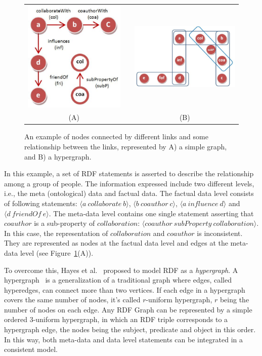 \begin{figure}[tbh]
\begin{center}
\begin{tabular}{ccc}
\includegraphics[width=.25\textwidth]{fig/reg_graph.eps} & &
\includegraphics[width=.43\textwidth]{fig/hypergraph.eps}\\
(A) & & (B)\\
\end{tabular}
\end{center}
\caption{\label{fig:graphcomp} An example of nodes connected by different links and some relationship between the links, represented by A) a simple graph, and B) a hypergraph.}
\end{figure}

\begin{myexp}
\label{graphcomp}
In this example, a set of RDF statements is asserted to describe the relationship among a group of people. The information expressed include two different levels, i.e., the meta (ontological) data and factual data. The factual data level consists of following statements: $\langle a~ collaborate~ b\rangle$, $\langle b~ coauthor~ c\rangle$, $\langle a~ influence~ d\rangle$ and $\langle d~ friendOf~ e\rangle$. The meta-data level contains one single statement asserting that $coauthor$ is a sub-property of $collaboration$: $\langle coauthor~ subProperty~ collaboration\rangle$. In this case, the representation of $collaboration$ and $coauthor$ is inconsistent. They are represented as nodes at the factual data level and edges at the meta-data level (see Figure~\ref{fig:graphcomp}(A)).
\end{myexp}

To overcome this, Hayes et al.~\cite{GraphModelRDF} proposed to model RDF as a \emph{hypergraph}. A hypergraph~\cite{Hypergraph} is a generalization of a traditional graph where edges, called hyperedges, can connect more than two vertices. If each edge in a hypergraph covers the same number of nodes, it's called $r$-uniform hypergraph, $r$ being the number of nodes on each edge. Any RDF Graph can be represented by a simple ordered 3-uniform hypergraph, in which an RDF triple corresponds to a hypergraph edge, the nodes being the subject, predicate and object in this order. In this way, both meta-data and data level statements can be integrated in a consistent model.


